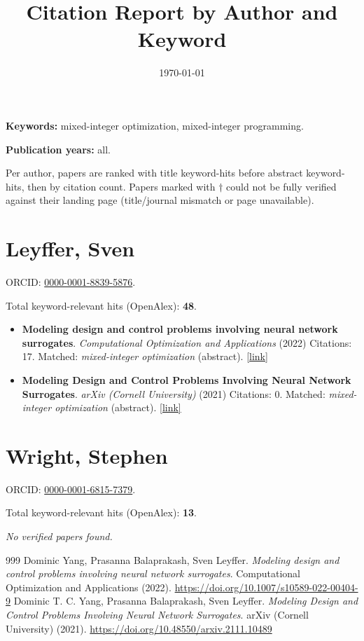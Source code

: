 \documentclass[letterpaper,11pt]{article}
\title{Citation Report by Author and Keyword}
\date{\today}
\begin{document}
\maketitle

\noindent\textbf{Keywords:} mixed-integer optimization, mixed-integer programming.\par
\noindent\textbf{Publication years:} all.\par
\noindent Per author, papers are ranked with title keyword-hits before abstract keyword-hits, then by citation count. Papers marked with $\dagger$ could not be fully verified against their landing page (title/journal mismatch or page unavailable).\par\medskip

\section*{Leyffer, Sven}
\noindent ORCID: \href{https://orcid.org/0000-0001-8839-5876}{0000-0001-8839-5876}.\par
\noindent Total keyword-relevant hits (OpenAlex): \textbf{48}.\par\medskip
\begin{itemize}[leftmargin=1.5em]
  \item \textbf{Modeling design and control problems involving neural network surrogates}. \emph{Computational Optimization and Applications} (2022) Citations: 17. Matched: \emph{mixed-integer optimization} (abstract). \href{https://doi.org/10.1007/s10589-022-00404-9}{[link]}~\cite{Yang20224114}
  \item \textbf{Modeling Design and Control Problems Involving Neural Network Surrogates}. \emph{arXiv (Cornell University)} (2021) Citations: 0. Matched: \emph{mixed-integer optimization} (abstract). \href{https://doi.org/10.48550/arxiv.2111.10489}{[link]}~\cite{Yang20214114}
\end{itemize}

\section*{Wright, Stephen}
\noindent ORCID: \href{https://orcid.org/0000-0001-6815-7379}{0000-0001-6815-7379}.\par
\noindent Total keyword-relevant hits (OpenAlex): \textbf{13}.\par\medskip
\emph{No verified papers found.}\par

\bigskip
\begin{thebibliography}{999}
 Dominic Yang, Prasanna Balaprakash, Sven Leyffer. \emph{Modeling design and control problems involving neural network surrogates}. Computational Optimization and Applications (2022). \href{https://doi.org/10.1007/s10589-022-00404-9}{https://doi.org/10.1007/s10589-022-00404-9}
 Dominic T. C. Yang, Prasanna Balaprakash, Sven Leyffer. \emph{Modeling Design and Control Problems Involving Neural Network Surrogates}. arXiv (Cornell University) (2021). \href{https://doi.org/10.48550/arxiv.2111.10489}{https://doi.org/10.48550/arxiv.2111.10489}
\end{thebibliography}
\end{document}
